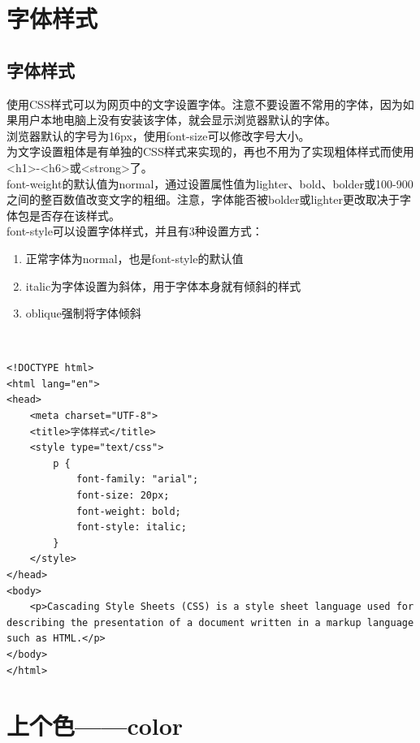 \section{字体样式}

\subsection{字体样式}

使用CSS样式可以为网页中的文字设置字体。注意不要设置不常用的字体，因为如果用户本地电脑上没有安装该字体，就会显示浏览器默认的字体。 \\

浏览器默认的字号为16px，使用font-size可以修改字号大小。 \\

为文字设置粗体是有单独的CSS样式来实现的，再也不用为了实现粗体样式而使用<h1>-<h6>或<strong>了。 \\

font-weight的默认值为normal，通过设置属性值为lighter、bold、bolder或100-900之间的整百数值改变文字的粗细。注意，字体能否被bolder或lighter更改取决于字体包是否存在该样式。 \\

font-style可以设置字体样式，并且有3种设置方式：

\begin{enumerate}
	\item 正常字体为normal，也是font-style的默认值
	\item italic为字体设置为斜体，用于字体本身就有倾斜的样式
	\item oblique强制将字体倾斜
\end{enumerate}

 \\
\begin{lstlisting}[style=htmlcssjs]
<!DOCTYPE html>
<html lang="en">
<head>
    <meta charset="UTF-8">
    <title>字体样式</title>
    <style type="text/css">
        p {
            font-family: "arial";
            font-size: 20px;
            font-weight: bold;
            font-style: italic;
        }   
    </style>
</head>
<body>
    <p>Cascading Style Sheets (CSS) is a style sheet language used for describing the presentation of a document written in a markup language such as HTML.</p>
</body>
</html>
\end{lstlisting}

\newpage

\section{上个色——color}

